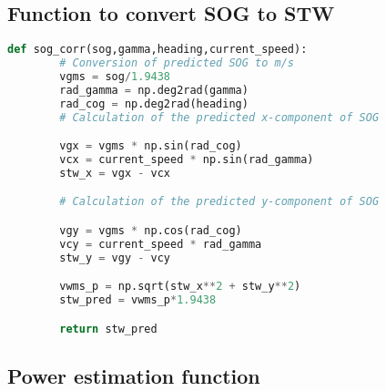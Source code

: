\subsection*{Function to convert SOG to STW}

\begin{lstlisting}[language=Python]
    def sog_corr(sog,gamma,heading,current_speed):
        # Conversion of predicted SOG to m/s
        vgms = sog/1.9438
        rad_gamma = np.deg2rad(gamma)
        rad_cog = np.deg2rad(heading)
        # Calculation of the predicted x-component of SOG

        vgx = vgms * np.sin(rad_cog)
        vcx = current_speed * np.sin(rad_gamma)
        stw_x = vgx - vcx

        # Calculation of the predicted y-component of SOG 

        vgy = vgms * np.cos(rad_cog)
        vcy = current_speed * rad_gamma
        stw_y = vgy - vcy

        vwms_p = np.sqrt(stw_x**2 + stw_y**2)
        stw_pred = vwms_p*1.9438

        return stw_pred
\end{lstlisting}

\subsection*{Power estimation function}

